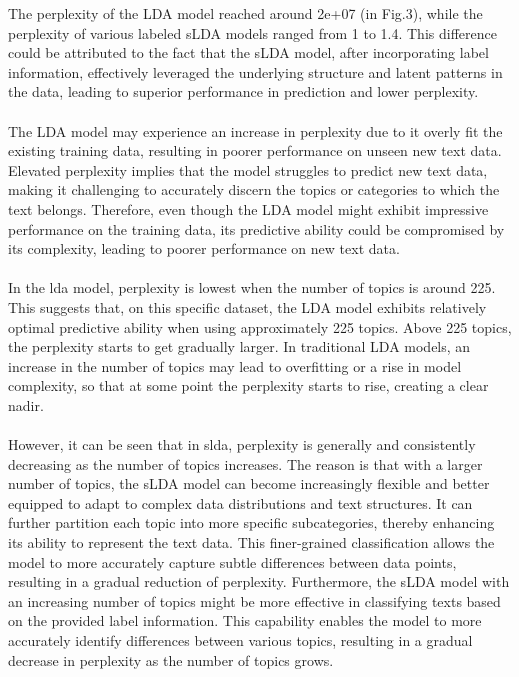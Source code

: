 \documentclass[12pt,twoside]{article}
\begin{document}
The perplexity of the LDA model reached around 2e+07 (in Fig.3), while the perplexity of various labeled sLDA models ranged from 1 to 1.4. This difference could be attributed to the fact that the sLDA model, after incorporating label information, effectively leveraged the underlying structure and latent patterns in the data, leading to superior performance in prediction and lower perplexity.\\\\

The LDA model may experience an increase in perplexity due to it overly fit the existing training data, resulting in poorer performance on unseen new text data. Elevated perplexity implies that the model struggles to predict new text data, making it challenging to accurately discern the topics or categories to which the text belongs. Therefore, even though the LDA model might exhibit impressive performance on the training data, its predictive ability could be compromised by its complexity, leading to poorer performance on new text data.\\\\

In the lda model, perplexity is lowest when the number of topics is around 225. This suggests that, on this specific dataset, the LDA model exhibits relatively optimal predictive ability when using approximately 225 topics. Above 225 topics, the perplexity starts to get gradually larger. In traditional LDA models, an increase in the number of topics may lead to overfitting or a rise in model complexity, so that at some point the perplexity starts to rise, creating a clear nadir.\\\\

However, it can be seen that in slda, perplexity is generally and consistently decreasing as the number of topics increases. The reason is that with a larger number of topics, the sLDA model can become increasingly flexible and better equipped to adapt to complex data distributions and text structures. It can further partition each topic into more specific subcategories, thereby enhancing its ability to represent the text data. This finer-grained classification allows the model to more accurately capture subtle differences between data points, resulting in a gradual reduction of perplexity. Furthermore, the sLDA model with an increasing number of topics might be more effective in classifying texts based on the provided label information. This capability enables the model to more accurately identify differences between various topics, resulting in a gradual decrease in perplexity as the number of topics grows.\\\\
\end{document}
